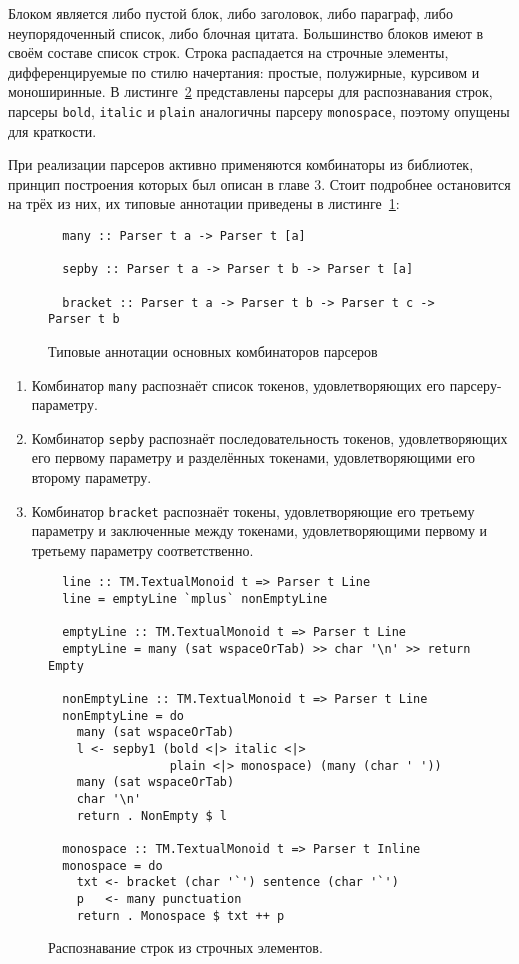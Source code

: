   Блоком является либо пустой блок, либо заголовок, либо параграф, либо
  неупорядоченный список, либо блочная цитата. Большинство блоков имеют в своём
  составе список строк. Строка распадается на строчные элементы, дифференцируемые
  по стилю начертания: простые, полужирные, курсивом и моноширинные.
  В листинге~\ref{listing:MarkdownInline} представлены парсеры для распознавания
  строк, парсеры \lstinline{bold}, \lstinline{italic} и \lstinline{plain}
  аналогичны парсеру \lstinline{monospace}, поэтому опущены для краткости.

  При реализации парсеров активно применяются комбинаторы из библиотек, принцип
  построения которых был описан в главе 3. Стоит подробнее остановится
  на трёх из них, их типовые аннотации приведены в
  листинге~\ref{listing:ParserCombinators}:

  \begin{figure}[h]
  \begin{lstlisting}
  many :: Parser t a -> Parser t [a]

  sepby :: Parser t a -> Parser t b -> Parser t [a]

  bracket :: Parser t a -> Parser t b -> Parser t c -> Parser t b
  \end{lstlisting}
  \caption{Типовые аннотации основных комбинаторов парсеров}
  \label{listing:ParserCombinators}
  \end{figure}

  \begin{enumerate}
    \item Комбинатор \lstinline{many} распознаёт список токенов, удовлетворяющих
    его парсеру-параметру.
    \item Комбинатор \lstinline{sepby} распознаёт последовательность токенов,
    удовлетворяющих его первому параметру и разделённых токенами, удовлетворяющими
    его второму параметру.
    \item Комбинатор \lstinline{bracket} распознаёт токены, удовлетворяющие его
    третьему параметру и заключенные между токенами, удовлетворяющими первому и
    третьему параметру соответственно.
  \end{enumerate}

  \begin{figure}[t]
  \begin{lstlisting}
  line :: TM.TextualMonoid t => Parser t Line
  line = emptyLine `mplus` nonEmptyLine

  emptyLine :: TM.TextualMonoid t => Parser t Line
  emptyLine = many (sat wspaceOrTab) >> char '\n' >> return Empty

  nonEmptyLine :: TM.TextualMonoid t => Parser t Line
  nonEmptyLine = do
    many (sat wspaceOrTab)
    l <- sepby1 (bold <|> italic <|>
                 plain <|> monospace) (many (char ' '))
    many (sat wspaceOrTab)
    char '\n'
    return . NonEmpty $ l

  monospace :: TM.TextualMonoid t => Parser t Inline
  monospace = do
    txt <- bracket (char '`') sentence (char '`')
    p   <- many punctuation
    return . Monospace $ txt ++ p
  \end{lstlisting}
  \caption{Распознавание строк из строчных элементов.}
  \label{listing:MarkdownInline}
  \end{figure}

